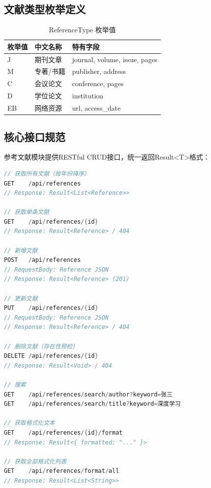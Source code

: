 \subsection{文献类型枚举定义}

\begin{table}[htbp]
\centering
\caption{ReferenceType 枚举值}
\label{tab:reftype}
\begin{tabular}{llp{8cm}}
\toprule
\textbf{枚举值} & \textbf{中文名称} & \textbf{特有字段} \\
\midrule
J  & 期刊文章 & journal, volume, issue, pages \\
M  & 专著/书籍 & publisher, address \\
C  & 会议论文 & conference, pages \\
D  & 学位论文 & institution \\
EB & 网络资源 & url, access\_date \\
\bottomrule
\end{tabular}
\end{table}

\subsection{核心接口规范}

参考文献模块提供RESTful CRUD接口，统一返回Result<T>格式：

\begin{lstlisting}[language=Java,caption={ReferenceController 核心接口}]
// 获取所有文献（按年份降序）
GET    /api/references
// Response: Result<List<Reference>>

// 获取单条文献
GET    /api/references/{id}
// Response: Result<Reference> / 404

// 新增文献
POST   /api/references
// RequestBody: Reference JSON
// Response: Result<Reference> (201)

// 更新文献
PUT    /api/references/{id}
// RequestBody: Reference JSON
// Response: Result<Reference> / 404

// 删除文献（存在性预检）
DELETE /api/references/{id}
// Response: Result<Void> / 404

// 搜索
GET    /api/references/search/author?keyword=张三
GET    /api/references/search/title?keyword=深度学习

// 获取格式化文本
GET    /api/references/{id}/format
// Response: Result<{ formatted: "..." }>

// 获取全部格式化列表
GET    /api/references/format/all
// Response: Result<List<String>>
\end{lstlisting}

